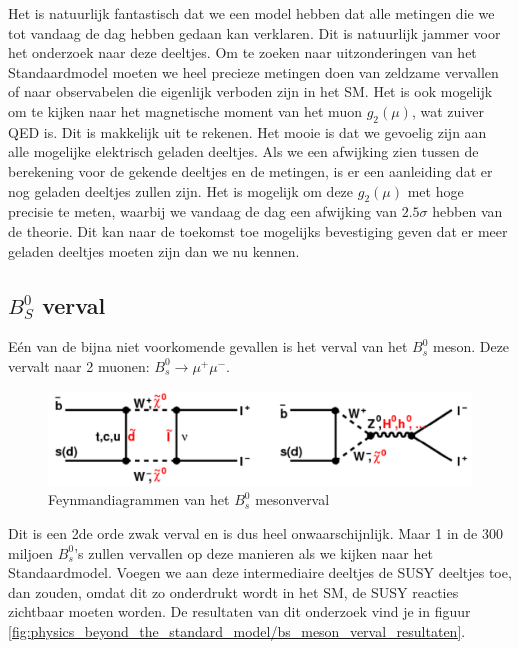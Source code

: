 \documentclass[../main.tex]{subfiles}
\begin{document}
Het is natuurlijk fantastisch dat we een model hebben dat alle metingen die we tot vandaag de dag hebben gedaan kan verklaren. Dit is natuurlijk jammer voor het onderzoek naar deze deeltjes. Om te zoeken naar uitzonderingen van het Standaardmodel moeten we heel precieze metingen doen van zeldzame vervallen of naar observabelen die eigenlijk verboden zijn in het SM. Het is ook mogelijk om te kijken naar het magnetische moment van het muon $g_2(\mu)$, wat zuiver QED is. Dit is makkelijk uit te rekenen. Het mooie is dat we gevoelig zijn aan alle mogelijke elektrisch geladen deeltjes. Als we een afwijking zien tussen de berekening voor de gekende deeltjes en de metingen, is er een aanleiding dat er nog geladen deeltjes zullen zijn. Het is mogelijk om deze $g_2(\mu)$ met hoge precisie te meten, waarbij we vandaag de dag een afwijking van $2.5\sigma$ hebben van de theorie. Dit kan naar de toekomst toe mogelijks bevestiging geven dat er meer geladen deeltjes moeten zijn dan we nu kennen.

\subsection{$B_S^0$ verval}%
\label{sub:_b_s_0_verval}

Eén van de bijna niet voorkomende gevallen is het verval van het $B_s^0$ meson. Deze vervalt naar 2 muonen: $B_{s}^{0} \rightarrow \mu^{+} \mu^{-}$.

\begin{figure}[h]
    \centering
    \includegraphics[width=0.7\linewidth]{physics_beyond_the_standard_model/bs_meson_verval.png}
    \caption{Feynmandiagrammen van het $B_s^0$ mesonverval}%
    \label{fig:physics_beyond_the_standard_model/bs_meson_verval}
\end{figure}

Dit is een 2de orde zwak verval en is dus heel onwaarschijnlijk. Maar 1 in de 300 miljoen $B_s^0$'s zullen vervallen op deze manieren als we kijken naar het Standaardmodel. Voegen we aan deze intermediaire deeltjes de SUSY deeltjes toe, dan zouden, omdat dit zo onderdrukt wordt in het SM, de SUSY reacties zichtbaar moeten worden. De resultaten van dit onderzoek vind je in figuur \ref{fig:physics_beyond_the_standard_model/bs_meson_verval_resultaten}.
\end{document}
